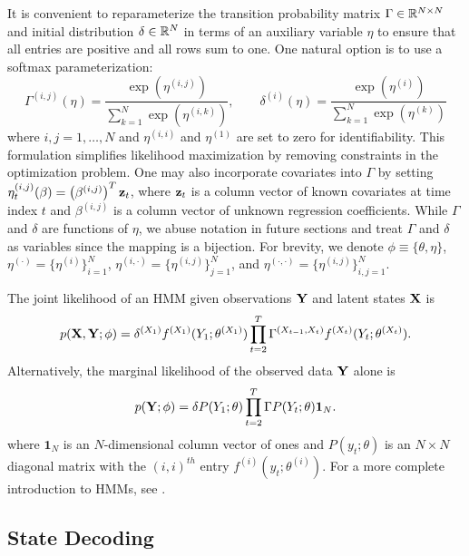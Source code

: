 It is convenient to reparameterize the transition probability matrix $\Gamma \in \mathbb{R}^{N \times N}$ and initial distribution $\delta \in \mathbb{R}^N$ in terms of an auxiliary variable $\eta$ to ensure that all entries are positive and all rows sum to one. One natural option is to use a softmax parameterization: %
%
\begin{equation}
    \Gamma^{(i,j)}(\eta) = \frac{\exp(\eta^{(i,j)})}{\sum_{k=1}^N \exp(\eta^{(i,k)})}, \qquad \delta^{(i)}(\eta) = \frac{\exp(\eta^{(i)})}{\sum_{k=1}^N \exp(\eta^{(k)})}
    \label{eqn:reparam}
\end{equation}
%
where $i,j = 1,\ldots,N$ and $\eta^{(i,i)}$ and $\eta^{(1)}$ are set to zero for identifiability. This formulation simplifies likelihood maximization by removing constraints in the optimization problem. One may also incorporate covariates into $\Gamma$ by setting $\eta_t^{(i,j)}(\beta) = \left(\beta^{(i,j)}\right)^T \mathbf{z}_t$, where $\mathbf{z}_t$ is a column vector of known covariates at time index $t$ and $\beta^{(i,j)}$ is a column vector of unknown regression coefficients. While $\Gamma$ and $\delta$ are functions of $\eta$, we abuse notation in future sections and treat $\Gamma$ and $\delta$ as variables since the mapping is a bijection.
%
For brevity, we denote $\phi \equiv \{\theta,\eta\}$, $\eta^{(\cdot)} = \{\eta^{(i)}\}_{i=1}^N$, 
$\eta^{(i,\cdot)} = \{\eta^{(i,j)}\}_{j=1}^N$, and $\eta^{(\cdot,\cdot)} = \{\eta^{(i,j)}\}_{i,j=1}^N$. 

The joint likelihood of an HMM given observations $\mathbf{Y}$ and latent states $\mathbf{X}$ is
%
\begin{equation}
    p(\mathbf{X},\mathbf{Y};\phi) = \delta^{(X_1)} f^{(X_1)}(Y_1; \theta^{(X_1)}) \prod_{t=2}^T \Gamma^{(X_{t-1},X_t)} f^{(X_t)}(Y_t; \theta^{(X_t)}).
    \label{eqn:like}
\end{equation}
%
Alternatively, the marginal likelihood of the observed data $\mathbf{Y}$ alone is 
%
\begin{equation}
    p(\mathbf{Y};\phi) = \delta P(Y_1;\theta) \prod_{t=2}^T \Gamma P(Y_t;\theta) \mathbf{1}_N.
    \label{eqn:like_marginal}
\end{equation}
%
where $\mathbf{1}_N$ is an $N$-dimensional column vector of ones and $P(y_t;\theta)$ is an $N \times N$ diagonal matrix with the $(i,i)^{th}$ entry $f^{(i)}(y_t; \theta^{(i)})$. For a more complete introduction to HMMs, see \citet{Zucchini:2016}.


\subsection{State Decoding}

